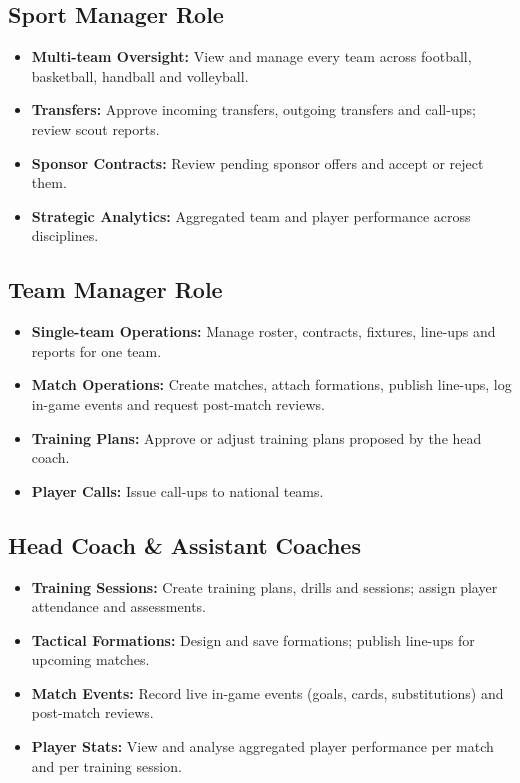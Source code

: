 \documentclass[12pt,a4paper,oneside]{report}
\begin{document}
\subsection*{Sport Manager Role}
\begin{itemize}[leftmargin=*]
  \item \textbf{Multi-team Oversight:} View and manage every team
        across football, basketball, handball and volleyball.
  \item \textbf{Transfers:} Approve incoming transfers, outgoing
        transfers and call-ups; review scout reports.
  \item \textbf{Sponsor Contracts:} Review pending sponsor offers and
        accept or reject them.
  \item \textbf{Strategic Analytics:} Aggregated team and player
        performance across disciplines.
\end{itemize}

\subsection*{Team Manager Role}
\begin{itemize}[leftmargin=*]
  \item \textbf{Single-team Operations:} Manage roster, contracts,
        fixtures, line-ups and reports for one team.
  \item \textbf{Match Operations:} Create matches, attach formations,
        publish line-ups, log in-game events and request post-match
        reviews.
  \item \textbf{Training Plans:} Approve or adjust training plans
        proposed by the head coach.
  \item \textbf{Player Calls:} Issue call-ups to national teams.
\end{itemize}

\subsection*{Head Coach \& Assistant Coaches}
\begin{itemize}[leftmargin=*]
  \item \textbf{Training Sessions:} Create training plans, drills and
        sessions; assign player attendance and assessments.
  \item \textbf{Tactical Formations:} Design and save formations;
        publish line-ups for upcoming matches.
  \item \textbf{Match Events:} Record live in-game events (goals,
        cards, substitutions) and post-match reviews.
  \item \textbf{Player Stats:} View and analyse aggregated player
        performance per match and per training session.
\end{itemize}
\end{document}
